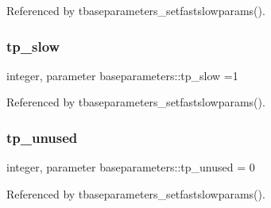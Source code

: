 Referenced by tbaseparameters\+\_\+setfastslowparams().

\mbox{\label{namespacebaseparameters_aec8c4b0ea0429954337dcf5fced6abf1}} 
\subsubsection{\texorpdfstring{tp\+\_\+slow}{tp\_slow}}
{\footnotesize\ttfamily integer, parameter baseparameters\+::tp\+\_\+slow =1\hspace{0.3cm}{\ttfamily [private]}}



Referenced by tbaseparameters\+\_\+setfastslowparams().

\mbox{\label{namespacebaseparameters_aa9a374c82230367604ae6b1c50ed3e3b}} 
\subsubsection{\texorpdfstring{tp\+\_\+unused}{tp\_unused}}
{\footnotesize\ttfamily integer, parameter baseparameters\+::tp\+\_\+unused = 0\hspace{0.3cm}{\ttfamily [private]}}



Referenced by tbaseparameters\+\_\+setfastslowparams().

